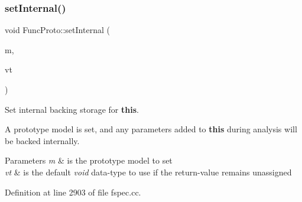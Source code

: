 \subsubsection{\texorpdfstring{setInternal()}{setInternal()}}
{\footnotesize\ttfamily void Func\+Proto\+::set\+Internal (\begin{DoxyParamCaption}\item[{\mbox{\hyperlink{class_proto_model}{Proto\+Model}} $\ast$}]{m,  }\item[{\mbox{\hyperlink{class_datatype}{Datatype}} $\ast$}]{vt }\end{DoxyParamCaption})}



Set internal backing storage for {\bfseries{this}}. 

A prototype model is set, and any parameters added to {\bfseries{this}} during analysis will be backed internally. 
\begin{DoxyParams}{Parameters}
{\em m} & is the prototype model to set \\
\hline
{\em vt} & is the default {\itshape void} data-\/type to use if the return-\/value remains unassigned \\
\hline
\end{DoxyParams}


Definition at line 2903 of file fspec.\+cc.

